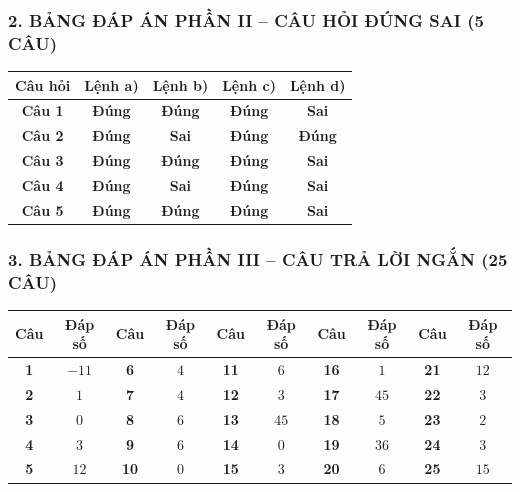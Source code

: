 \documentclass[12pt,a4paper]{article}
\begin{document}
\subsubsection*{2. BẢNG ĐÁP ÁN PHẦN II -- CÂU HỎI ĐÚNG SAI (5 CÂU)}

\begin{center}
\renewcommand{\arraystretch}{1.22}
\begin{tabular}{|c|c|c|c|c|}
\hline
\textbf{Câu hỏi} & \textbf{Lệnh a)} & \textbf{Lệnh b)} & \textbf{Lệnh c)} & \textbf{Lệnh d)} \\ \hline
\textbf{Câu 1} & \textbf{Đúng} & \textbf{Đúng} & \textbf{Đúng} & \textbf{Sai} \\ \hline
\textbf{Câu 2} & \textbf{Đúng} & \textbf{Sai} & \textbf{Đúng} & \textbf{Đúng} \\ \hline
\textbf{Câu 3} & \textbf{Đúng} & \textbf{Đúng} & \textbf{Đúng} & \textbf{Sai} \\ \hline
\textbf{Câu 4} & \textbf{Đúng} & \textbf{Sai} & \textbf{Đúng} & \textbf{Sai} \\ \hline
\textbf{Câu 5} & \textbf{Đúng} & \textbf{Đúng} & \textbf{Đúng} & \textbf{Sai} \\ \hline
\end{tabular}
\end{center}

\subsubsection*{3. BẢNG ĐÁP ÁN PHẦN III -- CÂU TRẢ LỜI NGẮN (25 CÂU)}

\begin{center}
\renewcommand{\arraystretch}{1.22}
\begin{tabular}{|c|c||c|c||c|c||c|c||c|c|}
\hline
\textbf{Câu} & \textbf{Đáp số} & \textbf{Câu} & \textbf{Đáp số} & \textbf{Câu} & \textbf{Đáp số} & \textbf{Câu} & \textbf{Đáp số} & \textbf{Câu} & \textbf{Đáp số} \\ \hline
\textbf{1} & $-11$ & \textbf{6} & $4$ & \textbf{11} & $6$ & \textbf{16} & $1$ & \textbf{21} & $12$ \\ \hline
\textbf{2} & $1$ & \textbf{7} & $4$ & \textbf{12} & $3$ & \textbf{17} & $45$ & \textbf{22} & $3$ \\ \hline
\textbf{3} & $0$ & \textbf{8} & $6$ & \textbf{13} & $45$ & \textbf{18} & $5$ & \textbf{23} & $2$ \\ \hline
\textbf{4} & $3$ & \textbf{9} & $6$ & \textbf{14} & $0$ & \textbf{19} & $36$ & \textbf{24} & $3$ \\ \hline
\textbf{5} & $12$ & \textbf{10} & $0$ & \textbf{15} & $3$ & \textbf{20} & $6$ & \textbf{25} & $15$ \\ \hline
\end{tabular}
\end{center}
\end{document}
